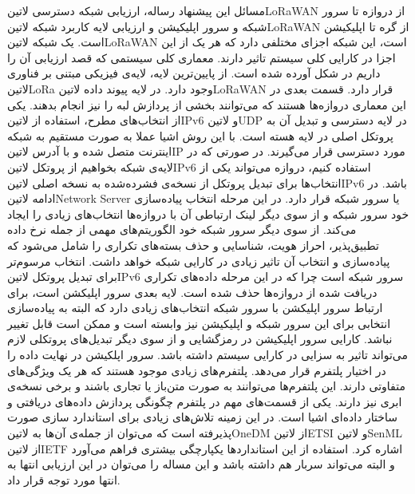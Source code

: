 

مسائل این پیشنهاد رساله، ارزیابی شبکه دسترسی ‌لاتین{LoRaWAN} از دروازه تا سرور شبکه و سرور اپلیکیشن و ارزیابی لایه کاربرد شبکه ‌لاتین{LoRaWAN} از گره تا اپلیکیشن است.
یک شبکه ‌لاتین{LoRaWAN} است، این شبکه اجزای مختلفی دارد که هر یک از این اجزا در کارایی کلی سیستم تاثیر دارند.
معماری کلی سیستمی که قصد ارزیابی آن را داریم در شکل  آورده شده است.
از پایین‌ترین لایه، لایه‌ی فیزیکی مبتنی بر فناوری ‌لاتین{LoRa} وجود دارد.
در لایه پیوند داده ‌لاتین{LoRaWAN} قرار دارد.
قسمت بعدی در این معماری دروازه‌ها هستند که می‌توانند بخشی از پردازش لبه را نیز انجام بدهند.
یکی از انتخاب‌های مطرح، استفاده از ‌لاتین{IPv6} و ‌لاتین{UDP} در لایه دسترسی و تبدیل آن به پروتکل اصلی در لایه هسته است. با این روش
اشیا عملا به صورت مستقیم به شبکه اینترنت متصل شده و با آدرس ‌لاتین{IP} مورد دسترسی قرار می‌گیرند.
در صورتی که در لایه‌ی شبکه بخواهیم از پروتکل ‌لاتین{IPv6} استفاده کنیم،
دروازه می‌تواند یکی از انتخاب‌ها برای تبدیل پروتکل از نسخه‌ی فشرده‌شده به نسخه اصلی ‌لاتین{IPv6} باشد.
در ادامه ‌لاتین{Network Server} یا سرور شبکه قرار دارد. در این مرحله انتخاب پیاده‌سازی خود سرور شبکه و از سوی دیگر لینک ارتباطی آن با
دروازه‌ها انتخاب‌های زیادی را ایجاد می‌کند. از سوی دیگر سرور شبکه خود الگوریتم‌های مهمی از جمله نرخ داده تطبیق‌پذیر، احراز هویت، شناسایی و حذف بسته‌های تکراری را شامل می‌شود
که پیاده‌سازی و انتخاب آن تاثیر زیادی در کارایی شبکه خواهد داشت. انتخاب مرسوم‌تر برای تبدیل پروتکل ‌لاتین{IPv6} سرور شبکه است چرا که در این مرحله داده‌های تکراری دریافت شده از
دروازه‌ها حذف شده است.
لایه بعدی سرور اپلیکشن است، برای ارتباط سرور اپلیکشن با سرور شبکه انتخاب‌های زیادی دارد که البته به پیاده‌سازی انتخابی برای این سرور شبکه و اپلیکیشن نیز وابسته است
و ممکن است قابل تغییر نباشد. کارایی سرور اپلیکیشن در رمزگشایی و از سوی دیگر تبدیل‌های پروتکلی لازم می‌تواند تاثیر به سزایی در کارایی سیستم داشته باشد.
سرور اپلکیشن در نهایت داده را در اختیار پلتفرم قرار می‌دهد. پلتفرم‌های زیادی موجود هستند که هر یک ویژگی‌های متفاوتی دارند.
این پلتفرم‌ها می‌توانند به صورت متن‌باز یا تجاری باشند و برخی نسخه‌ی ابری نیز دارند.
یکی از قسمت‌های مهم
در پلتفرم چگونگی پردازش داده‌های دریافتی و ساختار داده‌ای اشیا است. در این زمینه تلاش‌های زیادی برای استاندارد سازی صورت پذیرفته است که می‌توان از
جمله‌ی آن‌ها به ‌لاتین{OneDM} از ‌لاتین{ETSI} و ‌لاتین{SenML} از ‌لاتین{IETF} اشاره کرد. استفاده از این استانداردها یکپارچگی
بیشتری فراهم می‌آورد و البته می‌تواند سربار هم داشته باشد و این مساله را می‌توان در این ارزیابی انتها به انتها مورد توجه قرار داد.
